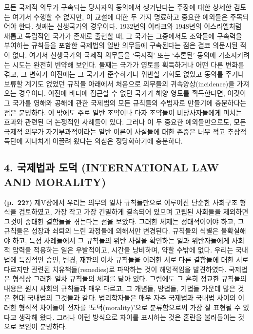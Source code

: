 모든 국제적 의무가 구속되는 당사자의 동의에서 생겨난다는 주장에 대한
상세한 검토는 여기서 수행할 수 없지만, 이 교설에 대한 두 가지 명료하고
중요한 예외들은 주목되어야 한다. 첫째는 신생국가의 경우이다. 1932년의
이라크와 1948년의 이스라엘처럼 새롭고 독립적인 국가가 존재로 출현할 때,
그 국가는 그중에서도 조약들에 구속력을 부여하는 규칙들을 포함한 국제법의
일반 의무들에 구속된다는 점은 결코 의문시된 적이 없다. 여기서 신생국가의
국제적 의무들을 ‘묵시적’ 또는 ‘추론된’ 동의에 기초시키려는 시도는 완전히
빈약해 보인다. 둘째는 국가가 영토를 획득하거나 어떤 다른 변화를 겪고, 그
변화가 이전에는 그 국가가 준수하거나 위반할 기회도 없었고 동의를 주거나
보류할 계기도 없었던 규칙들 아래에서 처음으로 의무들의
귀속양상(incidence)을 가져오는 경우이다. 이전에 바다에 접근할 수 없던
국가가 해양 영토를 획득한다면, 이것이 그 국가를 영해와 공해에 관한
국제법의 모든 규칙들의 수범자로 만들기에 충분하다는 점은 분명하다. 이
밖에도 주로 일반 조약이나 다자 조약들이 비당사자들에게 미치는 효과와
관련된 더 논쟁적인 사례들이 있다. 그러나 이 두 중요한 예외들만으로도,
모든 국제적 의무가 자기부과적이라는 일반 이론이 사실들에 대한 존중은
너무 적고 추상적 독단에 지나치게 이끌려 왔다는 의심은 정당화하기에
충분하다.

\subsection{4. 국제법과 도덕 (INTERNATIONAL LAW AND
MORALITY)}\label{uxad6duxc81cuxbc95uxacfc-uxb3c4uxb355-international-law-and-morality}

\textbf{(p.~227)} 제V장에서 우리는 의무의 일차 규칙들만으로 이루어진
단순한 사회구조 형식을 검토하였고, 가장 작고 가장 긴밀하게 결속되어
있으며 고립된 사회들을 제외하면 그것이 중대한 결함들을 겪는다는 점을
보았다. 그러한 체제는 정태적이어야 하고, 그 규칙들은 성장과 쇠퇴의 느린
과정들에 의해서만 변경된다. 규칙들의 식별은 불확실해야 하고, 특정
사례들에서 그 규칙들의 위반 사실을 확인하는 일과 위반자들에게 사회적
압력을 적용하는 일은 우발적이고, 시간을 낭비하며, 약할 수밖에 없다.
우리는 국내법에 특징적인 승인, 변경, 재판의 이차 규칙들을 이러한 서로
다른 결함들에 대한 서로 다르지만 관련된 치유책들(remedies)로 파악하는
것이 해명적임을 발견하였다. 국제법은 형식상 그러한 일차 규칙들의 체제를
닮아 있다. 그럼에도 그 흔히 정교한 규칙들의 내용은 원시 사회의 규칙들과
매우 다르고, 그 개념들, 방법들, 기법들 가운데 많은 것은 현대 국내법의
그것들과 같다. 법리학자들은 매우 자주 국제법과 국내법 사이의 이러한
형식적 차이들이 전자를 ‘도덕(morality)’으로 분류함으로써 가장 잘 표현될
수 있다고 생각해 왔다. 그러나 이런 방식으로 차이를 표시하는 것은 혼란을
불러들이는 것으로 보임이 분명하다.

